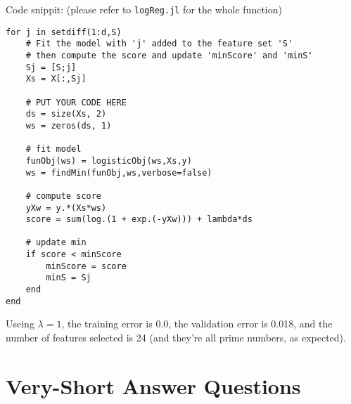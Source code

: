 \documentclass{article}
\begin{document}
Code snippit: (please refer to \texttt{logReg.jl} for the whole function)
\begin{verbatim}
for j in setdiff(1:d,S)
    # Fit the model with 'j' added to the feature set 'S'
    # then compute the score and update 'minScore' and 'minS'
    Sj = [S;j]
    Xs = X[:,Sj]

    # PUT YOUR CODE HERE
    ds = size(Xs, 2)
    ws = zeros(ds, 1)

    # fit model
    funObj(ws) = logisticObj(ws,Xs,y)
    ws = findMin(funObj,ws,verbose=false)

    # compute score
    yXw = y.*(Xs*ws)
    score = sum(log.(1 + exp.(-yXw))) + lambda*ds

    # update min
    if score < minScore
        minScore = score
        minS = Sj
    end
end
\end{verbatim}

Useing $\lambda = 1$, the training error is 0.0, the validation error is 0.018, and the number of features selected is 24 (and they're all prime numbers, as expected).

\section{Very-Short Answer Questions}
\end{document}
